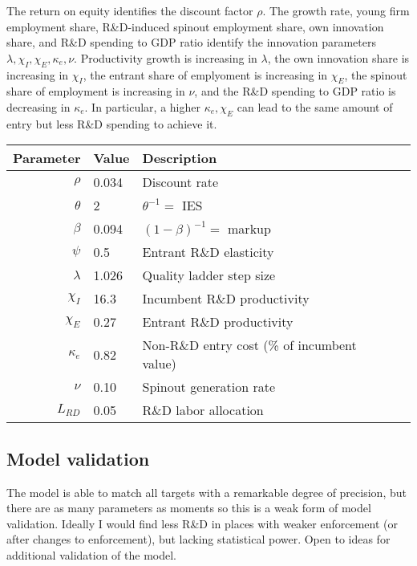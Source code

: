 \documentclass[12pt,english]{article}
\theoremstyle{remark}
\begin{document}
The return on equity identifies the discount factor $\rho$. The growth rate, young firm employment share, R\&D-induced spinout employment share, own innovation share, and R\&D spending to GDP ratio identify the innovation parameters $\lambda, \chi_I, \chi_E, \kappa_e, \nu$. Productivity growth is increasing in $\lambda$, the own innovation share is increasing in $\chi_I$, the entrant share of emplyoment is increasing in $\chi_E$, the spinout share of employment is increasing in $\nu$, and the R\&D spending to GDP ratio is decreasing in $\kappa_e$. In particular, a higher $\kappa_e, \chi_E$ can lead to the same amount of entry but less R\&D spending to achieve it.


\begin{table}[]
	\centering
	\label{calibration_parameters}
	\begin{tabular}{rlll}
		\toprule \toprule
		Parameter & Value & Description \tabularnewline
		\midrule
		$\rho$ & 0.034 & Discount rate \tabularnewline
		$\theta$ & 2 & $\theta^{-1} = $ IES
		\tabularnewline
		$\beta$ & 0.094 & $(1-\beta)^{-1} = $ markup\tabularnewline
		$\psi$ & 0.5 & Entrant R\&D elasticity \tabularnewline
		$\lambda$ & 1.026 & Quality ladder step size
		\tabularnewline
		$\chi_I$ & 16.3 & Incumbent R\&D productivity
		\tabularnewline
		$\chi_E$ & 0.27 & Entrant R\&D productivity \tabularnewline
		$\kappa_e$ & 0.82 & Non-R\&D entry cost (\% of incumbent value) \tabularnewline
		$\nu$ & 0.10 & Spinout generation rate \tabularnewline
		$L_{RD}$ & 0.05 & R\&D labor allocation \tabularnewline
		\bottomrule
	\end{tabular}
\end{table}

\subsection{Model validation} The model is able to match all targets with a remarkable degree of precision, but there are as many parameters as moments so this is a weak form of model validation. Ideally I would find less R\&D in places with weaker enforcement (or after changes to enforcement), but lacking statistical power. Open to ideas for additional validation of the model. 
\end{document}
